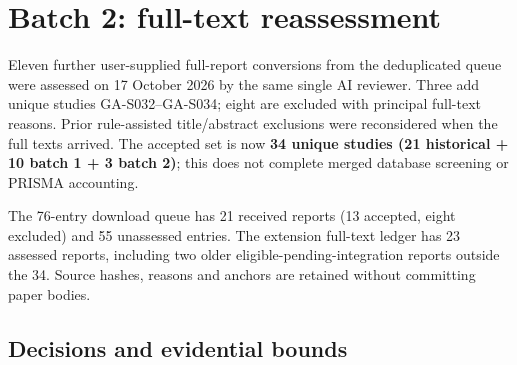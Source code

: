 \section{Batch 2: full-text reassessment}\label{sec:batch2}

Eleven further user-supplied full-report conversions from the deduplicated queue were assessed on 17 October 2026 by the same single AI reviewer. Three add unique studies GA-S032--GA-S034; eight are excluded with principal full-text reasons. Prior rule-assisted title/abstract exclusions were reconsidered when the full texts arrived. The accepted set is now \textbf{34 unique studies (21 historical + 10 batch 1 + 3 batch 2)}; this does not complete merged database screening or PRISMA accounting.

The 76-entry download queue has 21 received reports (13 accepted, eight excluded) and 55 unassessed entries. The extension full-text ledger has 23 assessed reports, including two older eligible-pending-integration reports outside the 34. Source hashes, reasons and anchors are retained without committing paper bodies.

\subsection{Decisions and evidential bounds}

